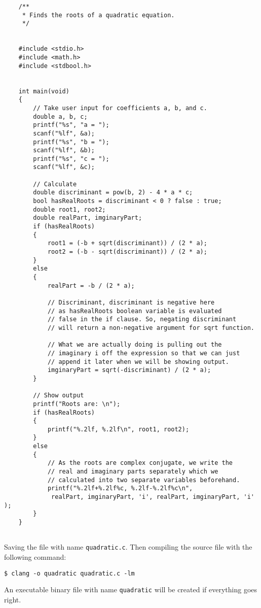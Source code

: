 \documentclass[12pt, letterpaper]{report}
\begin{document}
\begin{verbatim}
    /**
     * Finds the roots of a quadratic equation.
     */


    #include <stdio.h>
    #include <math.h>
    #include <stdbool.h>


    int main(void)
    {
        // Take user input for coefficients a, b, and c.
        double a, b, c;
        printf("%s", "a = ");
        scanf("%lf", &a);
        printf("%s", "b = ");
        scanf("%lf", &b);
        printf("%s", "c = ");
        scanf("%lf", &c);

        // Calculate
        double discriminant = pow(b, 2) - 4 * a * c;
        bool hasRealRoots = discriminant < 0 ? false : true;
        double root1, root2;
        double realPart, imginaryPart;
        if (hasRealRoots)
        {
            root1 = (-b + sqrt(discriminant)) / (2 * a);
            root2 = (-b - sqrt(discriminant)) / (2 * a);
        }
        else
        {
            realPart = -b / (2 * a);

            // Discriminant, discriminant is negative here 
            // as hasRealRoots boolean variable is evaluated
            // false in the if clause. So, negating discriminant
            // will return a non-negative argument for sqrt function.

            // What we are actually doing is pulling out the 
            // imaginary i off the expression so that we can just
            // append it later when we will be showing output.
            imginaryPart = sqrt(-discriminant) / (2 * a);
        }

        // Show output
        printf("Roots are: \n");
        if (hasRealRoots)
        {
            printf("%.2lf, %.2lf\n", root1, root2);
        }
        else
        {
            // As the roots are complex conjugate, we write the 
            // real and imaginary parts separately which we
            // calculated into two separate variables beforehand.
            printf("%.2lf+%.2lf%c, %.2lf-%.2lf%c\n",
             realPart, imginaryPart, 'i', realPart, imginaryPart, 'i' );
        }
    }


\end{verbatim}
Saving the file with name \texttt{quadratic.c}. Then compiling the source file with the following command:
\begin{verbatim}
$ clang -o quadratic quadratic.c -lm
\end{verbatim}
An executable binary file with name \texttt{quadratic} will be created if everything goes right.
\end{document}
